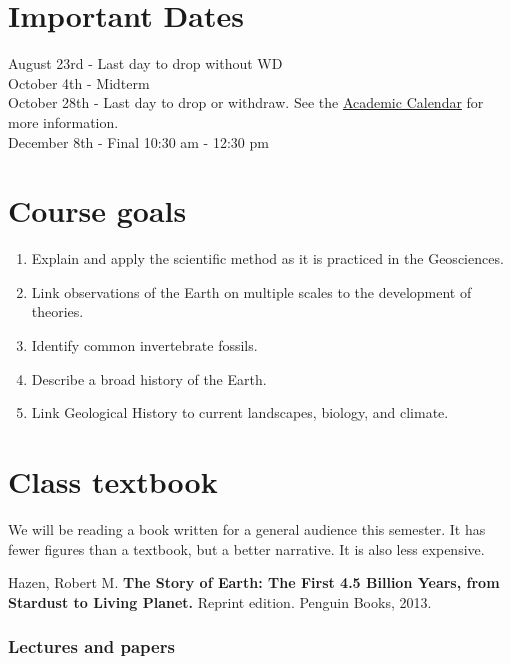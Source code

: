 \documentclass[11pt,]{article}
\providecommand{\tightlist}{%
  \setlength{\itemsep}{0pt}\setlength{\parskip}{0pt}}
\begin{document}
\hypertarget{important-dates}{%
\section{Important Dates}\label{important-dates}}

August 23rd - Last day to drop without WD\\
October 4th - Midterm\\
October 28th - Last day to drop or withdraw. See the
\href{https://www.southalabama.edu/academiccalendar/}{Academic Calendar}
for more information.\\
December 8th - Final 10:30 am - 12:30 pm\\

\hypertarget{course-goals}{%
\section{Course goals}\label{course-goals}}

\begin{enumerate}
\def\labelenumi{\arabic{enumi}.}
\tightlist
\item
  Explain and apply the scientific method as it is practiced in the
  Geosciences.
\item
  Link observations of the Earth on multiple scales to the development
  of theories.
\item
  Identify common invertebrate fossils.
\item
  Describe a broad history of the Earth.
\item
  Link Geological History to current landscapes, biology, and climate.
\end{enumerate}

\hypertarget{class-textbook}{%
\section{Class textbook}\label{class-textbook}}

We will be reading a book written for a general audience this semester.
It has fewer figures than a textbook, but a better narrative. It is also
less expensive.

Hazen, Robert M. \textbf{The Story of Earth: The First 4.5 Billion
Years, from Stardust to Living Planet.} Reprint edition. Penguin Books,
2013.

\hypertarget{lectures-and-papers}{%
\subsubsection{Lectures and papers}\label{lectures-and-papers}}
\end{document}
